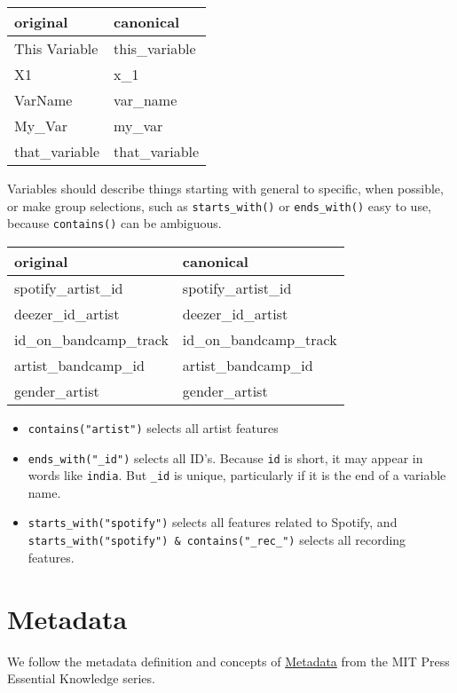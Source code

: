 \documentclass[
  fontsize=13pt,
  english,
  a4paper,
  openany, a4paper, oneside]{book}
\providecommand{\tightlist}{%
  \setlength{\itemsep}{0pt}\setlength{\parskip}{0pt}}
\begin{document}
\begin{tabular}{l|l}
\hline
original & canonical\\
\hline
This Variable & this\_variable\\
\hline
X1 & x\_1\\
\hline
VarName & var\_name\\
\hline
My\_Var & my\_var\\
\hline
that\_variable & that\_variable\\
\hline
\end{tabular}

Variables should describe things starting with general to specific, when possible, or make group selections, such as \texttt{starts\_with()} or \texttt{ends\_with()} easy to use, because \texttt{contains()} can be ambiguous.

\begin{tabular}{l|l}
\hline
original & canonical\\
\hline
spotify\_artist\_id & spotify\_artist\_id\\
\hline
deezer\_id\_artist & deezer\_id\_artist\\
\hline
id\_on\_bandcamp\_track & id\_on\_bandcamp\_track\\
\hline
artist\_bandcamp\_id & artist\_bandcamp\_id\\
\hline
gender\_artist & gender\_artist\\
\hline
\end{tabular}

\begin{itemize}
\tightlist
\item
  \texttt{contains("artist")} selects all artist features
\item
  \texttt{ends\_with("\_id")} selects all ID's. Because \texttt{id} is short, it may appear in words like \texttt{india}. But \texttt{\_id} is unique, particularly if it is the end of a variable name.
\item
  \texttt{starts\_with("spotify")} selects all features related to Spotify, and \texttt{starts\_with("spotify")\ \&\ contains("\_rec\_")} selects all recording features.
\end{itemize}

\hypertarget{metadata}{%
\chapter{Metadata}\label{metadata}}

We follow the metadata definition and concepts of \href{https://mitpress.mit.edu/books/metadata}{Metadata} from the MIT Press Essential Knowledge series.
\end{document}
